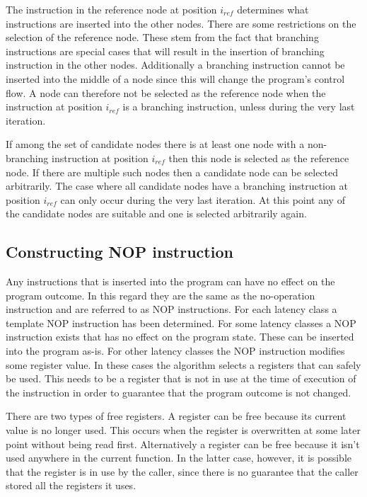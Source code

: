 The instruction in the reference node at position $i_{ref}$ determines what instructions are inserted into the other nodes. 
There are some restrictions on the selection of the reference node. 
These stem from the fact that branching instructions are special cases that will result in the insertion of branching instruction in the other nodes. 
Additionally a branching instruction cannot be inserted into the middle of a node since this will change the program's control flow. 
A node can therefore not be selected as the reference node when the instruction at position $i_{ref}$ is a branching instruction, unless during the very last iteration. 

If among the set of candidate nodes there is at least one node with a non-branching instruction at position $i_{ref}$ then this node is selected as the reference node. 
If there are multiple such nodes then a candidate node can be selected arbitrarily. 
The case where all candidate nodes have a branching instruction at position $i_{ref}$ can only occur during the very last iteration. 
At this point any of the candidate nodes are suitable and one is selected arbitrarily again. 

\subsection{Constructing NOP instruction}
\label{sec:nop}
Any instructions that is inserted into the program can have no effect on the program outcome. In this regard they are the same as the no-operation instruction and are 
referred to as NOP instructions. For each latency class a template NOP instruction has been determined. 
For some latency classes a NOP instruction exists that has no effect on the program state. These can be inserted into the program as-is. 
For other latency classes the NOP instruction modifies some register value. In these cases the algorithm selects a registers that can safely be used. 
This needs to be a register that is not in use at the time of execution of the instruction in order to guarantee that the program outcome is not changed. 

There are two types of free registers. 
A register can be free because its current value is no longer used. This occurs when the register is overwritten at some later point without being read first. 
Alternatively a register can be free because it isn't used anywhere in the current function. 
In the latter case, however, it is possible that the register is in use by the caller, since there is no guarantee that the caller stored all the registers it uses. 

